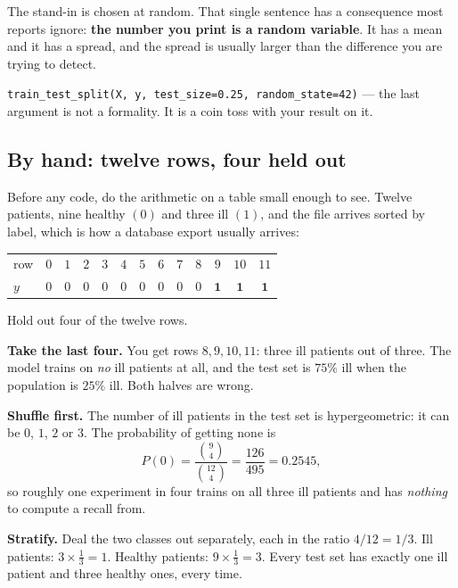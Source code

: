 \documentclass[11pt]{article}
\begin{document}
The stand-in is chosen at random. That single sentence has a consequence most
reports ignore: \textbf{the number you print is a random variable}. It has a
mean and it has a spread, and the spread is usually larger than the difference
you are trying to detect.

\begin{keyidea}
\texttt{train\_test\_split(X, y, test\_size=0.25, random\_state=42)} --- the
last argument is not a formality. It is a coin toss with your result on it.
\end{keyidea}

\subsection{By hand: twelve rows, four held out}

Before any code, do the arithmetic on a table small enough to see. Twelve
patients, nine healthy $(0)$ and three ill $(1)$, and the file arrives sorted
by label, which is how a database export usually arrives:

\begin{center}\small
\begin{tabular}{@{}lcccccccccccc@{}}
  \toprule
  row & $0$ & $1$ & $2$ & $3$ & $4$ & $5$ & $6$ & $7$ & $8$ & $9$ & $10$ &
    $11$\\
  $y$ & $0$&$0$&$0$&$0$&$0$&$0$&$0$&$0$&$0$&
    $\mathbf{1}$&$\mathbf{1}$&$\mathbf{1}$\\
  \bottomrule
\end{tabular}
\end{center}

\begin{worked}
Hold out four of the twelve rows.

\textbf{Take the last four.} You get rows $8,9,10,11$: three ill patients out
of three. The model trains on \emph{no} ill patients at all, and the test set
is $75\%$ ill when the population is $25\%$ ill. Both halves are wrong.

\textbf{Shuffle first.} The number of ill patients in the test set is
hypergeometric: it can be $0$, $1$, $2$ or $3$. The probability of getting
none is
\[
  P(0) = \frac{\binom{9}{4}}{\binom{12}{4}} = \frac{126}{495} = 0.2545,
\]
so roughly one experiment in four trains on all three ill patients and has
\emph{nothing} to compute a recall from.

\textbf{Stratify.} Deal the two classes out separately, each in the ratio
$4/12 = 1/3$. Ill patients: $3 \times \tfrac13 = 1$. Healthy patients:
$9 \times \tfrac13 = 3$. Every test set has exactly one ill patient and three
healthy ones, every time.
\end{worked}
\end{document}
